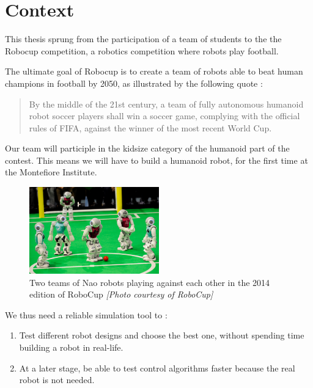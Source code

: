 \section{Context}
This thesis sprung from the participation of a team of students to the the Robocup competition, a robotics competition where robots play football.

The ultimate goal of Robocup is to create a team of robots able to beat human champions in football by 2050, as illustrated by the following quote :
\begin{quote}
By the middle of the 21st century, a team of fully autonomous humanoid robot soccer players shall win a soccer game, complying with the official rules of FIFA, against the winner of the most recent World Cup.
\end{quote}

Our team will participle in the kidsize category of the humanoid part of the contest. This means we will have to build a humanoid robot, for the first time at the Montefiore Institute.

\begin{figure}[htp]
\center
\includegraphics[width=0.5\textwidth]{figures/robocup}
\caption[Two teams of Nao robots playing against each other]{Two teams of Nao robots playing against each other in the 2014 edition of RoboCup \textit{[Photo courtesy of RoboCup]}}
\label{fig:intro_robocup}
\end{figure}

We thus need a reliable simulation tool to :
\begin{enumerate}
\item Test different robot designs and choose the best one, without spending time building a robot in real-life.
\item At a later stage, be able to test control algorithms faster because the real robot is not needed.
\end{enumerate}

